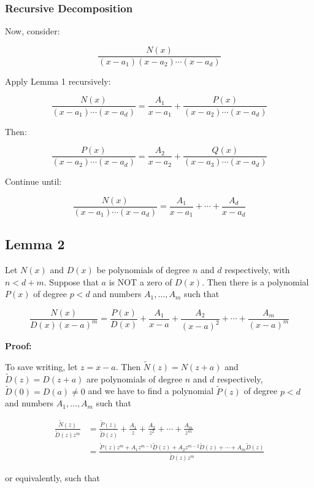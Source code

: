 \subsubsection{Recursive Decomposition}

Now, consider:

\[
    \frac{N(x)}{(x - a_1)(x - a_2)\cdots(x - a_d)}
\]

Apply Lemma 1 recursively:

\[
    \frac{N(x)}{(x - a_1)\cdots(x - a_d)} = \frac{A_1}{x - a_1} + \frac{P(x)}{(x - a_2)\cdots(x - a_d)}
\]

Then:

\[
    \frac{P(x)}{(x - a_2)\cdots(x - a_d)} = \frac{A_2}{x - a_2} + \frac{Q(x)}{(x - a_3)\cdots(x - a_d)}
\]

Continue until:

\[
    \frac{N(x)}{(x - a_1)\cdots(x - a_d)} = \frac{A_1}{x - a_1} + \cdots + \frac{A_d}{x - a_d}
\]

\subsection{Lemma 2}

Let \(N(x)\) and \(D(x)\) be polynomials of degree \(n\) and \(d\) respectively, with \(n < d + m\).
Suppose that \(a\) is NOT a zero of \(D(x)\). Then there is a polynomial \(P(x)\) of degree \(p < d\) and
numbers \(A_1, \dots, A_m\) such that

\[
    \frac{N(x)}{D(x) {(x-a)}^m} = \frac{P(x)}{D(x)} + \frac{A_1}{x-a} + \frac{A_2}{{(x-a)}^2} + \cdots + 
    \frac{A_m}{{(x-a)}^m}
\]

\textbf{Proof:} 

To save writing, let \(z = x - a\). Then \(\tilde{N}(z) = N(z + a)\) and \(\tilde{D}(z) = D(z + a)\)
are polynomials of degree \(n\) and \(d\) respectively, \(\tilde{D}(0) = D(a) \neq 0\) and we have to find a
polynomial \(\tilde{P}(z)\) of degree \(p < d\) and numbers \(A_1, \dots, A_m\) such that

\begin{align*}
    \frac{\tilde{N}(z)}{\tilde{D}(z) z^m} &= \frac{\tilde{P}(z)}{\tilde{D}(z)} + \frac{A_1}{z} + \frac{A_2}{z^2} + \cdots + \frac{A_m}{z^m} \\
    &= \frac{\tilde{P}(z) z^m + A_1 z^{m-1} \tilde{D}(z) + A_2 z^{m-2} \tilde{D}(z) + \cdots + A_m \tilde{D}(z)}{\tilde{D}(z) z^m}
\end{align*}

or equivalently, such that

